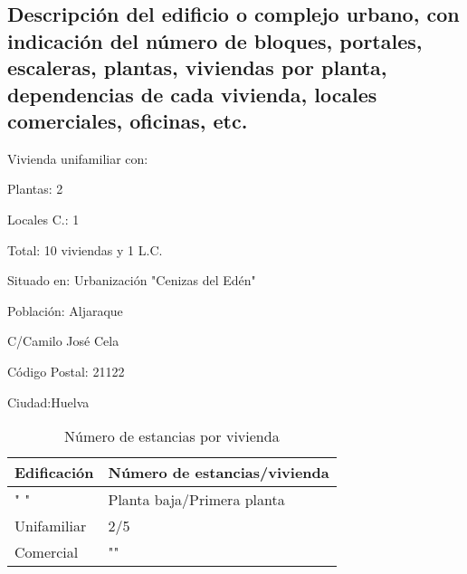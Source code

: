 \subsection{Descripción del edificio o complejo urbano, con indicación del número de bloques, portales, escaleras, plantas, viviendas por planta, dependencias de cada vivienda, locales comerciales, oficinas, etc.}
Vivienda unifamiliar con:


Plantas: 2


Locales C.: 1


Total: 10 viviendas y 1 L.C.


	Situado en: Urbanización "Cenizas del Edén"
	
	Población: Aljaraque
	
	C/Camilo José Cela
	
	Código Postal: 21122 
	
	Ciudad:Huelva
	
\begin{table}[H]
\centering
\begin{tabular}{p{2cm} p{5cm}}
\hline
Edificación&Número de estancias/vivienda\\
\hline \hline
" "&Planta baja/Primera planta\\
\hline
Unifamiliar&2/5 \\
\hline
Comercial&""
\end{tabular}
\caption{Número de estancias por vivienda}
\label{tabla:autores}
\end{table}


	